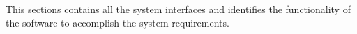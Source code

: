 This sections contains all the system interfaces and identifies the functionality of the software to accomplish the system requirements.



